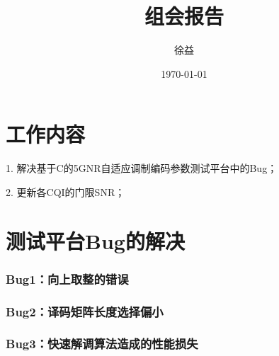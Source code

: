 \documentclass{article}
\title{组会报告}
\author{徐益}
\date{\today}
\begin{document}
\maketitle


\section{工作内容} 
1. 解决基于C的5GNR自适应调制编码参数测试平台中的Bug；

2. 更新各CQI的门限SNR；

\section{测试平台Bug的解决}
\subsubsection{Bug1：向上取整的错误}

\subsubsection{Bug2：译码矩阵长度选择偏小}

\subsubsection{Bug3：快速解调算法造成的性能损失}

\end{document}
